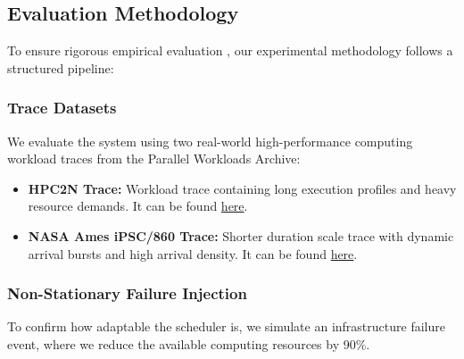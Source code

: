 \subsection{Evaluation Methodology}
To ensure rigorous empirical evaluation \citep{Zhao2025Scheduling}, our experimental methodology follows a structured pipeline:

\subsubsection{Trace Datasets}
We evaluate the system using two real-world high-performance computing workload traces from the Parallel Workloads Archive:
\begin{itemize}
    \item \textbf{HPC2N Trace:} Workload trace containing long execution profiles and heavy resource demands. It can be found \href{https://www.cs.huji.ac.il/labs/parallel/workload/l_hpc2n/index.html}{here}.
    \item \textbf{NASA Ames iPSC/860 Trace:} Shorter duration scale trace with dynamic arrival bursts and high arrival density. It can be found \href{https://www.cs.huji.ac.il/labs/parallel/workload/l_nasa_ipsc/}{here}.
\end{itemize}

\subsubsection{Non-Stationary Failure Injection}
To confirm how adaptable the scheduler is, we simulate an infrastructure failure event, where we reduce the available computing resources by 90\%.